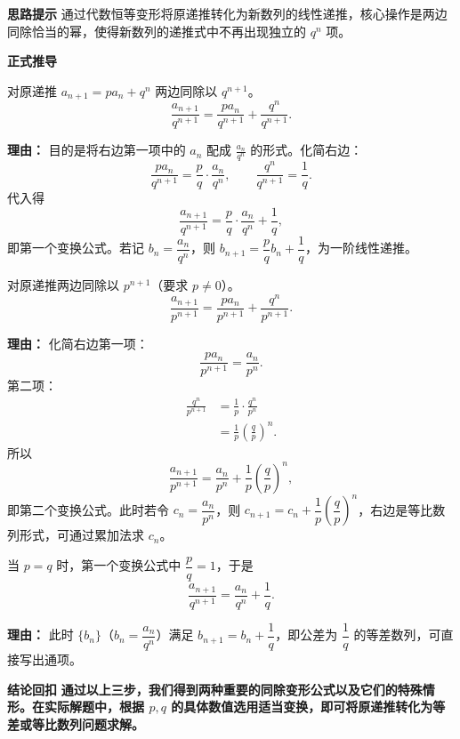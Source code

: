 \begin{proofbox}
	\textbf{\textcolor{CProof}{思路提示}}
	通过代数恒等变形将原递推转化为新数列的线性递推，核心操作是两边同除恰当的幂，使得新数列的递推式中不再出现独立的 $q^n$ 项。

	\medskip
	\textbf{\textcolor{CProof}{正式推导}}
	\begin{description}[style=nextline, leftmargin=2.8em, labelsep=0.5em, itemsep=0.55em]
		\item[\textbf{步骤一（除以 $q^{n+1}$ 变形）：}]
			对原递推 $a_{n+1}=pa_n+q^n$ 两边同除以 $q^{n+1}$。
			\[
				\frac{a_{n+1}}{q^{n+1}} = \frac{pa_n}{q^{n+1}} + \frac{q^n}{q^{n+1}}.
			\]
			\par\textbf{理由：} 目的是将右边第一项中的 $a_n$ 配成 $\frac{a_n}{q^n}$ 的形式。化简右边：
			\[
				\frac{pa_n}{q^{n+1}} = \frac{p}{q}\cdot\frac{a_n}{q^n},
				\qquad
				\frac{q^n}{q^{n+1}} = \frac{1}{q}.
			\]
			代入得
			\[
				\frac{a_{n+1}}{q^{n+1}} = \frac{p}{q}\cdot\frac{a_n}{q^n}+\frac{1}{q},
			\]
			即第一个变换公式。若记 $b_n=\dfrac{a_n}{q^n}$，则 $b_{n+1}=\dfrac{p}{q}b_n+\dfrac{1}{q}$，为一阶线性递推。
		\item[\textbf{步骤二（除以 $p^{n+1}$ 变形）：}]
			对原递推两边同除以 $p^{n+1}$（要求 $p\neq0$）。
			\[
				\frac{a_{n+1}}{p^{n+1}} = \frac{pa_n}{p^{n+1}} + \frac{q^n}{p^{n+1}}.
			\]
			\par\textbf{理由：} 化简右边第一项：
			\[
				\frac{pa_n}{p^{n+1}} = \frac{a_n}{p^n}.
			\]
			第二项：
			\[
				\begin{aligned}
					\frac{q^n}{p^{n+1}} &= \frac{1}{p}\cdot\frac{q^n}{p^n} \\ &= \frac{1}{p}\left(\frac{q}{p}\right)^n.
			\end{aligned}
			\]
			所以
			\[
				\frac{a_{n+1}}{p^{n+1}} = \frac{a_n}{p^n} + \frac{1}{p}\left(\frac{q}{p}\right)^n,
			\]
			即第二个变换公式。此时若令 $c_n=\dfrac{a_n}{p^n}$，则 $c_{n+1}=c_n+\dfrac{1}{p}\left(\dfrac{q}{p}\right)^n$，右边是等比数列形式，可通过累加法求 $c_n$。
		\item[\textbf{步骤三（$p=q$ 特例）：}]
			当 $p=q$ 时，第一个变换公式中 $\dfrac{p}{q}=1$，于是
			\[
				\frac{a_{n+1}}{q^{n+1}} = \frac{a_n}{q^n} + \frac{1}{q}.
			\]
			\par\textbf{理由：} 此时 $\{b_n\}$（$b_n=\dfrac{a_n}{q^n}$）满足 $b_{n+1}=b_n+\dfrac{1}{q}$，即公差为 $\dfrac{1}{q}$ 的等差数列，可直接写出通项。
	\end{description}

	\medskip
	\textbf{\textcolor{CProof}{结论回扣}}
	\textbf{通过以上三步，我们得到两种重要的同除变形公式以及它们的特殊情形。在实际解题中，根据 $p,q$ 的具体数值选用适当变换，即可将原递推转化为等差或等比数列问题求解。}
\end{proofbox}
